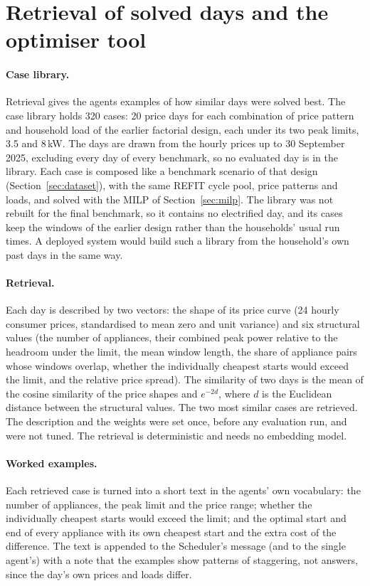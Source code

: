 \documentclass[12pt,a4paper]{report}
\begin{document}
\section{Retrieval of solved days and the optimiser tool}
\label{sec:rag-design}

\paragraph{Case library.} Retrieval gives the agents examples of how
similar days were solved best. The case library holds
320 cases: 20 price days for each combination of price pattern and
household load of the earlier factorial design, each under its two peak
limits, 3.5 and 8\,kW. The days are drawn from the hourly prices up to
30 September 2025, excluding every day of every benchmark, so no
evaluated day is in the library. Each case is composed like a benchmark
scenario of that design (Section~\ref{sec:dataset}), with the same REFIT
cycle pool, price patterns and loads, and solved with the MILP of
Section~\ref{sec:milp}. The library was not rebuilt for the final
benchmark, so it contains no electrified day, and its cases keep the
windows of the earlier design rather than the households' usual run
times. A deployed system would build such a library from the
household's own past days in the same way.

\paragraph{Retrieval.} Each day is described by two vectors: the shape
of its price curve (24 hourly consumer prices, standardised to mean zero
and unit variance) and six structural values (the number of appliances,
their combined peak power relative to the headroom under the limit, the
mean window length, the share of appliance pairs whose windows overlap,
whether the individually cheapest starts would exceed the limit, and the
relative price spread). The similarity of two days is the mean of the
cosine similarity of the price shapes and $e^{-2d}$, where $d$ is the
Euclidean distance between the structural values. The two most similar
cases are retrieved. The description and the weights were set once,
before any evaluation run, and were not tuned. The retrieval is
deterministic and needs no embedding model.

\paragraph{Worked examples.} Each retrieved case is turned into a short
text in the agents' own vocabulary: the number of appliances, the peak
limit and the price range; whether the individually cheapest starts
would exceed the limit; and the optimal start and end of every
appliance with its own cheapest start and the extra cost of the
difference. The text is appended to the Scheduler's message (and to the
single agent's) with a note that the examples show patterns of
staggering, not answers, since the day's own prices and loads differ.
\end{document}
